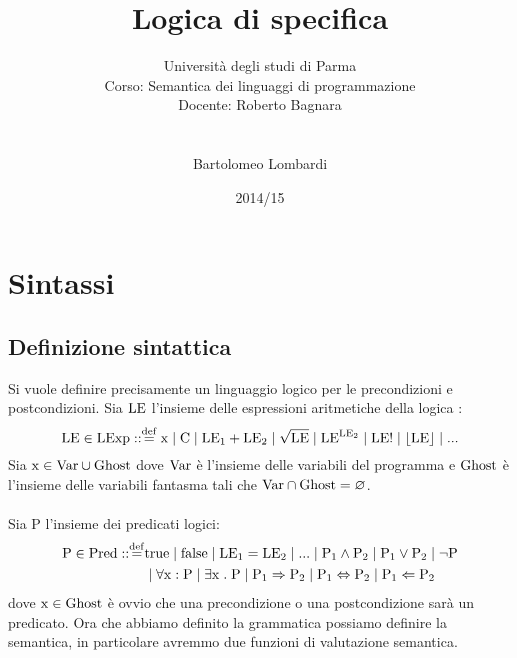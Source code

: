 \documentclass[a4paper, 12pt, oneside,fleqn]{book}
\begin{document}
\title{Logica di specifica}
\author{Università degli studi di Parma \\
Corso: Semantica dei linguaggi di programmazione \\
Docente: Roberto Bagnara \\\\\\
Bartolomeo Lombardi
}
\date{2014/15}
\maketitle
\tableofcontents

\newpage
\chapter{Sintassi}
\section{Definizione sintattica}
\theoremstyle{definition}
Si vuole definire precisamente un linguaggio logico per le precondizioni e postcondizioni. Sia $\mathrm{LE}$ l'insieme delle espressioni aritmetiche della logica :
$$\LE \in \LExp \itc\itc\defeq \idx \mid \C \mid \LE{_1} + \LE{_2} \mid \sqrt{\LE} \mid \LE^{\LE{_2}} \mid \LE! \mid \lfloor \LE \rfloor \mid ...$$
Sia $\mathrm{x}\in\mathrm{Var}\cup\mathrm{Ghost}$ dove $\mathrm{Var}$ è l'insieme delle variabili del programma e $\mathrm{Ghost}$ è l'insieme delle variabili fantasma tali che $\mathrm{Var}\cap\mathrm{Ghost} = \varnothing$.\\\\
Sia P l'insieme dei predicati logici: 
\begin{align*}
\p \in \Pred \itc\itc\defeq &\true \mid\false\mid\LE{_1} = \LE{_2}\mid ...\mid \p{_1} \wedge \p{_2} \mid \p{_1} \vee \p{_2} \mid \neg \p\\
&\mid \forall\idx\itc \p\mid \exists\idx\st \p\mid \p{_1} \Rightarrow \p{_2} \mid \p{_1} \Leftrightarrow \p{_2} \mid \p{_1} \Leftarrow \p{_2}
\end{align*}
dove $\mathrm{x}\in\mathrm{Ghost}$ è ovvio che una precondizione o una postcondizione sarà un predicato. Ora che abbiamo definito la grammatica possiamo definire la semantica, in particolare avremmo due funzioni di valutazione semantica.
\end{document}
